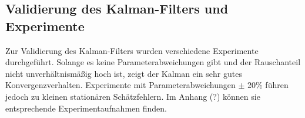 \documentclass[times, 10pt,twocolumn]{article}
\begin{document}
	\subsection{Validierung des Kalman-Filters und Experimente}
	Zur Validierung des Kalman-Filters wurden verschiedene Experimente durchgeführt. Solange es keine Parameterabweichungen gibt und der Rauschanteil nicht unverhältnismäßig hoch ist, zeigt der Kalman ein sehr gutes Konvergenzverhalten. Experimente mit Parameterabweichungen $\pm$ 20\% führen jedoch zu kleinen stationären Schätzfehlern. Im Anhang (?) können sie entsprechende Experimentaufnahmen finden.
	

\nocite{ex3}
\end{document}
